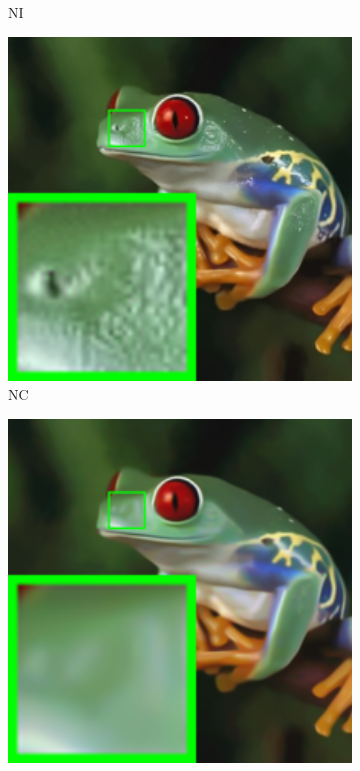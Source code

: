 \begin{figure}
\begin{subfigure}[t]{0.19\textwidth}
\caption{NI}
    \end{subfigure}
\hfill
    \begin{subfigure}[t]{0.19\textwidth}
        \centering
        \includegraphics[width=1\textwidth]{images/mcwnnm/nc/resize_br_NC_frog.png}
		\caption{NC}
    \end{subfigure}
    \hfill
    \begin{subfigure}[t]{0.19\textwidth}
        \centering
        \includegraphics[width=1\textwidth]{images/mcwnnm/nc/resize_br_WNNMcw_frog.png}

\end{subfigure}
\end{figure}
